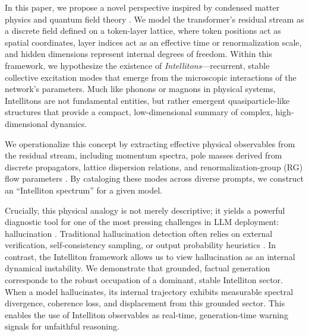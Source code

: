 \documentclass[11pt]{article}
\begin{document}
In this paper, we propose a novel perspective inspired by condensed matter physics and quantum field theory \citep{wilson1979problems,weinberg1995quantum,cheung2008effective,kaplan2024simplest}. We model the transformer's residual stream as a discrete field defined on a token-layer lattice, where token positions act as spatial coordinates, layer indices act as an effective time or renormalization scale, and hidden dimensions represent internal degrees of freedom. Within this framework, we hypothesize the existence of \emph{Intellitons}---recurrent, stable collective excitation modes that emerge from the microscopic interactions of the network's parameters. Much like phonons or magnons in physical systems, Intellitons are not fundamental entities, but rather emergent quasiparticle-like structures that provide a compact, low-dimensional summary of complex, high-dimensional dynamics.

We operationalize this concept by extracting effective physical observables from the residual stream, including momentum spectra, pole masses derived from discrete propagators, lattice dispersion relations, and renormalization-group (RG) flow parameters \citep{raju2026modelerrors}. By cataloging these modes across diverse prompts, we construct an ``Intelliton spectrum'' for a given model.

Crucially, this physical analogy is not merely descriptive; it yields a powerful diagnostic tool for one of the most pressing challenges in LLM deployment: hallucination \citep{ji2023survey,huang2023survey}. Traditional hallucination detection often relies on external verification, self-consistency sampling, or output probability heuristics \citep{manakul2023selfcheckgpt,kadavath2022language}. In contrast, the Intelliton framework allows us to view hallucination as an internal dynamical instability. We demonstrate that grounded, factual generation corresponds to the robust occupation of a dominant, stable Intelliton sector. When a model hallucinates, its internal trajectory exhibits measurable spectral divergence, coherence loss, and displacement from this grounded sector. This enables the use of Intelliton observables as real-time, generation-time warning signals for unfaithful reasoning.
\end{document}
